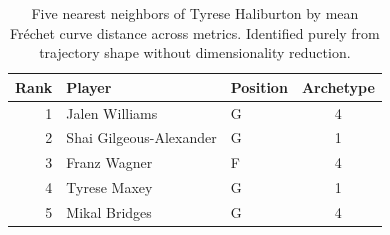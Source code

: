 \begin{table}[htbp]
  \centering\small
  \begin{tabular}{rllc}
    \toprule
    Rank & Player & Position & Archetype \\
    \midrule
    1 & Jalen Williams & G & 4 \\
    2 & Shai Gilgeous-Alexander & G & 1 \\
    3 & Franz Wagner & F & 4 \\
    4 & Tyrese Maxey & G & 1 \\
    5 & Mikal Bridges & G & 4 \\
    \bottomrule
  \end{tabular}
  \caption{Five nearest neighbors of Tyrese Haliburton by mean Fr\'{e}chet curve distance across metrics. Identified purely from trajectory shape without dimensionality reduction.}
  \label{tab:Tyrese_Haliburton_frechet_curve_neighbors}
\end{table}

